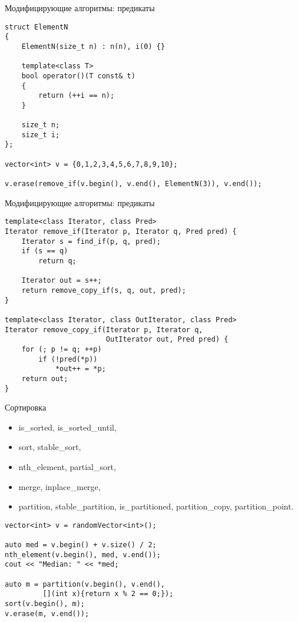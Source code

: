 \documentclass{beamer}
\begin{document}
\begin{frame}[fragile]{Модифицирующие алгоритмы: предикаты}
\begin{lstlisting}
struct ElementN 
{
    ElementN(size_t n) : n(n), i(0) {}

    template<class T>
    bool operator()(T const& t) 
    { 
        return (++i == n); 
    }
    
    size_t n;
    size_t i;
};

vector<int> v = {0,1,2,3,4,5,6,7,8,9,10};

v.erase(remove_if(v.begin(), v.end(), ElementN(3)), v.end());
\end{lstlisting}
\end{frame}

\begin{frame}[fragile]{Модифицирующие алгоритмы: предикаты}
\begin{lstlisting}
template<class Iterator, class Pred>
Iterator remove_if(Iterator p, Iterator q, Pred pred) {
    Iterator s = find_if(p, q, pred);
    if (s == q)
        return q;

    Iterator out = s++;
    return remove_copy_if(s, q, out, pred);
}    

template<class Iterator, class OutIterator, class Pred>
Iterator remove_copy_if(Iterator p, Iterator q, 
                        OutIterator out, Pred pred) {
    for (; p != q; ++p)
        if (!pred(*p))
            *out++ = *p;
    return out;
}
\end{lstlisting}
\end{frame}

\begin{frame}[fragile]{Сортировка}
\begin{itemize}
    \tt
    \item is\_sorted, is\_sorted\_until,
    \item sort, stable\_sort,
    \item nth\_element, partial\_sort,
    \item merge, inplace\_merge,
    \item partition, stable\_partition, is\_partitioned, partition\_copy, partition\_point.
\end{itemize}
\pause
\begin{lstlisting}
vector<int> v = randomVector<int>();

auto med = v.begin() + v.size() / 2;
nth_element(v.begin(), med, v.end());
cout << "Median: " << *med;

auto m = partition(v.begin(), v.end(), 
         [](int x){return x % 2 == 0;});
sort(v.begin(), m);
v.erase(m, v.end());        
\end{lstlisting}
\end{frame}
\end{document}
